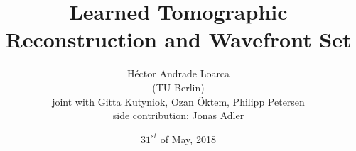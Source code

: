 \title[AFG Oberseminar]{Learned Tomographic Reconstruction and Wavefront Set}
\author[H\'ector Andrade Loarca]{H\'ector Andrade Loarca\\ \scriptsize{(TU Berlin)} \\
				\scriptsize{joint with Gitta Kutyniok, Ozan \"Oktem, Philipp Petersen}\\
				\scriptsize{side contribution: Jonas Adler}}
\date[31.05.2018]{$31^{st}$ of May, 2018}


\newcommand{\mylogo}{\texttt{[image: ./Images/AFG.pdf]}}

\begin{frame}[plain]
	\titlepage
\end{frame}

